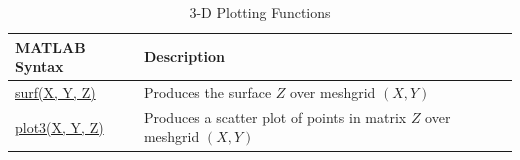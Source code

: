 \documentclass[../MATLAB_Primer.tex]{subfiles}
\begin{document}
\begin{table}[H]
\caption{3-D Plotting Functions}
    \begin{center}
        \begin{tabular}{| C{3cm} | m{12cm}|}
            \hline
            \textbf{MATLAB Syntax} & \textbf{Description}\\
            
            \hline
            \href{https://www.mathworks.com/help/matlab/ref/surf.html}{\color{blue}surf(X, Y, Z)} & Produces the surface $Z$ over meshgrid $(X,Y)$ \\
            \hline
            \href{https://www.mathworks.com/help/matlab/ref/plot3.html}{\color{blue}plot3(X, Y, Z)} & Produces a scatter plot of points in matrix $Z$ over meshgrid $(X,Y)$ \\
            \hline
        \end{tabular}
        \label{tab:3D_plotting}
    \end{center}
\end{table}
\end{document}
